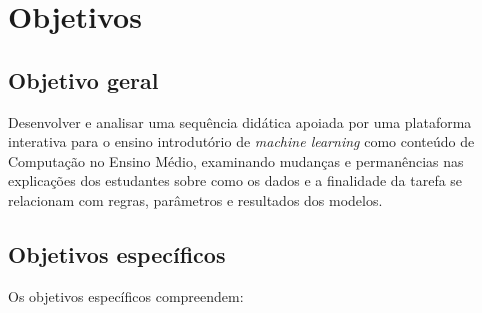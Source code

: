\chapter{Objetivos}

\section{Objetivo geral}

Desenvolver e analisar uma sequência didática apoiada por uma plataforma interativa para o ensino introdutório de \textit{machine learning} como conteúdo de Computação no Ensino Médio, examinando mudanças e permanências nas explicações dos estudantes sobre como os dados e a finalidade da tarefa se relacionam com regras, parâmetros e resultados dos modelos.

\section{Objetivos específicos}

Os objetivos específicos compreendem:

